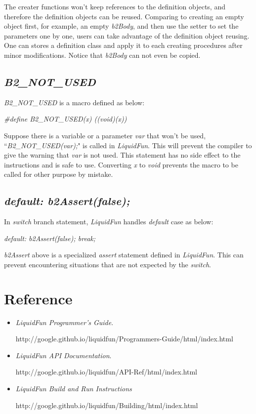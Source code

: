 \documentclass[UTF8]{ctexart}
\begin{document}
            The creater functions won't keep references to the definition objects, and therefore the definition objects can be reused. Comparing to creating an empty object first, for example, an empty \textit{b2Body}, and then use the setter to set the parameters one by one, users can take advantage of the definition object reusing. One can stores a definition class and apply it to each creating procedures after minor modifications. Notice that \textit{b2Body} can not even be copied.

        \subsection{\textit{B2\_NOT\_USED}}

            \textit{B2\_NOT\_USED} is a macro defined as below:

            \textit{\#define B2\_NOT\_USED(x) ((void)(x))}

            Suppose there is a variable or a parameter \textit{var} that won't be used, ``\textit{B2\_NOT\_USED(var);}" is called in \textit{LiquidFun}. This will prevent the compiler to give the warning that \textit{var} is not used. This statement has no side effect to the instructions and is safe to use. Converting \textit{x} to \textit{void} prevents the macro to be called for other purpose by mistake.

        \subsection{\textit{default: b2Assert(false);}}

            In \textit{switch} branch statement, \textit{LiquidFun} handles \textit{default} case as below:

            \textit{default: b2Assert(false); break;}

            \textit{b2Assert} above is a specialized \textit{assert} statement defined in \textit{LiquidFun}. This can prevent encountering situations that are not expected by the \textit{switch}.

    \section{Reference}

        \begin{itemize}
            \item \textit{LiquidFun Programmer's Guide}.

                  http://google.github.io/liquidfun/Programmers-Guide/html/index.html
                  
            \item \textit{LiquidFun API Documentation}.

                  http://google.github.io/liquidfun/API-Ref/html/index.html

            \item \textit{LiquidFun Build and Run Instructions}

                http://google.github.io/liquidfun/Building/html/index.html

        \end{itemize}
\end{document}
